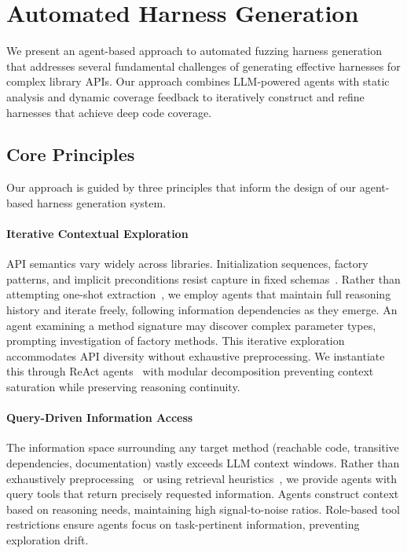 \section{Automated Harness Generation}%
\label{sec:approach}
We present an agent-based approach to automated fuzzing harness generation that addresses several fundamental challenges of generating effective harnesses for complex library APIs. Our approach combines LLM-powered agents with static analysis and dynamic coverage feedback to iteratively construct and refine harnesses that achieve deep code coverage.
%
\subsection{Core Principles}%
\label{subsec:core-principles}
Our approach is guided by three principles that inform the design of our agent-based harness generation system.
\paragraph{Iterative Contextual Exploration}
API semantics vary widely across libraries. Initialization sequences, factory patterns, and implicit preconditions resist capture in fixed schemas~\cite{CITE:template-based-test-gen}. Rather than attempting one-shot extraction~\cite{CITE:one-shot-LLM-generation}, we employ agents that maintain full reasoning history and iterate freely, following information dependencies as they emerge. An agent examining a method signature may discover complex parameter types, prompting investigation of factory methods. This iterative exploration accommodates API diversity without exhaustive preprocessing. We instantiate this through ReAct agents~\cite{yao2023react} with modular decomposition preventing context saturation while preserving reasoning continuity.

\paragraph{Query-Driven Information Access}
The information space surrounding any target method (reachable code, transitive dependencies, documentation) vastly exceeds LLM context windows. Rather than exhaustively preprocessing~\cite{CITE:static-analysis-preprocessing} or using retrieval heuristics~\cite{CITE:RAG-for-code}, we provide agents with query tools that return precisely requested information. Agents construct context based on reasoning needs, maintaining high signal-to-noise ratios. Role-based tool restrictions ensure agents focus on task-pertinent information, preventing exploration drift.

